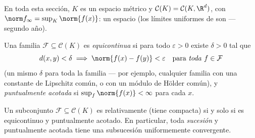 En toda esta sección, $K$ es un espacio métrico
\emph{} y $\mathcal
C(K) = \mathcal C(K, \R^d)$, con $\norm f_\infty = \sup_K
\norm{f(x)}$: un espacio 
(los límites uniformes de 
son  --- segundo año).

\begin{definition}\label{def:b3:complete:equicontinuous}
Una familia $\mathcal F \subseteq \mathcal C(K)$ es
\emph{equicontinua} si para todo
$\varepsilon > 0$ existe $\delta > 0$ tal que
\[
d(x, y) < \delta \implies \norm{f(x) - f(y)} < \varepsilon
\quad\text{para \emph{toda} } f \in \mathcal F
\]
(un mismo $\delta$ para toda la familia --- por ejemplo, cualquier
familia con una constante de Lipschitz común, o con un módulo de Hölder
común), y \emph{puntualmente acotada} si $\sup_{f}\norm{f(x)} < \infty$
para cada $x$.
\end{definition}

\begin{theorem}\label{thm:b3:complete:ascoli}
Un subconjunto $\mathcal F \subseteq \mathcal C(K)$ es relativamente
 (tiene
compacta) si y solo si es
equicontinuo y puntualmente
acotado. En particular, toda \emph{sucesión}
 y puntualmente
acotada tiene una subsucesión uniformemente convergente.
\end{theorem}

